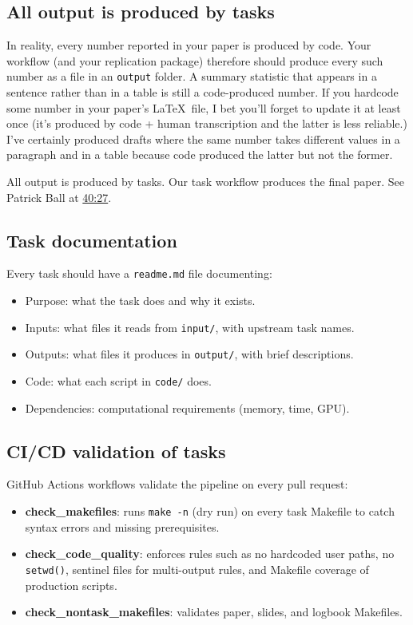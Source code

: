 \subsection{All output is produced by tasks}

In reality, every number reported in your paper is produced by code.
Your workflow (and your replication package) therefore should produce every such number as a file in an \texttt{output} folder.
A summary statistic that appears in a sentence rather than in a table is still a code-produced number.
If you hardcode some number in your paper's \LaTeX\ file, I bet you'll forget to update it at least once (it's produced by code + human transcription and the latter is less reliable.)
I've certainly produced drafts where the same number takes different values in a paragraph and in a table because code produced the latter but not the former.

All output is produced by tasks.
Our task workflow produces the final paper.
See Patrick Ball at \href{https://www.youtube.com/watch?v=ZSunU9GQdcI&t=40m27s}{40:27}.

\subsection{Task documentation}

Every task should have a \texttt{readme.md} file documenting:
\begin{itemize}
	\item Purpose: what the task does and why it exists.
	\item Inputs: what files it reads from \texttt{input/}, with upstream task names.
	\item Outputs: what files it produces in \texttt{output/}, with brief descriptions.
	\item Code: what each script in \texttt{code/} does.
	\item Dependencies: computational requirements (memory, time, GPU).
\end{itemize}

\subsection{CI/CD validation of tasks}

GitHub Actions workflows validate the pipeline on every pull request:
\begin{itemize}
	\item \textbf{check\_makefiles}: runs \texttt{make -n} (dry run) on every task Makefile to catch syntax errors and missing prerequisites.
	\item \textbf{check\_code\_quality}: enforces rules such as no hardcoded user paths, no \texttt{setwd()}, sentinel files for multi-output rules, and Makefile coverage of production scripts.
	\item \textbf{check\_nontask\_makefiles}: validates paper, slides, and logbook Makefiles.
\end{itemize}

